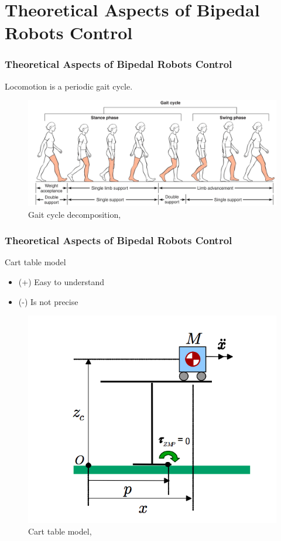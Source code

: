 \documentclass{beamer}
\begin{document}
	
	\section*{Theoretical Aspects of Bipedal Robots Control}
	\begin{frame}
		\frametitle{Theoretical Aspects of Bipedal Robots Control}
		\centering
		Locomotion is a periodic gait cycle.
		
		\begin{figure}[h!]
			\begin{minipage}[H]{\linewidth}
				\includegraphics[width=\linewidth]{presentation_images/26}
				\caption{Gait cycle decomposition, \cite{gait}}
			\end{minipage}
		\end{figure}
	\end{frame}
	

	\begin{frame}
		\frametitle{Theoretical Aspects of Bipedal Robots Control}
		\begin{block}{Cart table model}
			\begin{itemize}
				\item(+)
					Easy to understand
				\item(-)
					Is not precise
					
			\end{itemize}
		\end{block}
		
		\begin{figure}[h!]
			\begin{minipage}[H]{\linewidth}
				\centering
				\includegraphics[width=0.5\linewidth]{presentation_images/11}
				\caption{Cart table model, \cite{kajita2003biped}}
			\end{minipage}
		\end{figure}
	\end{frame}
\end{document}
